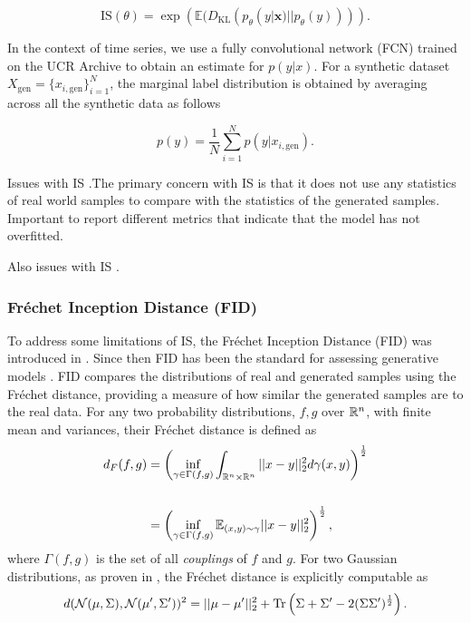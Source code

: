\documentclass[../../thesis.tex]{subfiles}
\begin{document}
\begin{equation}
    \label{IS}
    {\text{IS}}(\theta) = \exp\left( \mathbb{E}(D_{\text{KL}}(p_\theta(y|\mathbf{x}) || p_\theta(y))) \right).
\end{equation}

In the context of time series, we use a fully convolutional network (FCN) trained on the UCR Archive \cite{TimeVQVAE} to obtain an estimate for $p(y|x)$. For a synthetic dataset $X_{\text{gen}} = \{x_{i,\text{gen}}\}_{i=1}^N$, the marginal label distribution is obtained by averaging across all the synthetic data as follows

\[
    p(y) = \frac{1}{N} \sum_{i=1}^N p(y |x_{i,\text{gen}}).
\]

Issues with IS \cite{barratt2018note}.The primary concern with IS is that it does not use any statistics of real world samples to compare with the statistics of the generated samples. Important to report different metrics that indicate that the model has not overfitted. 

Also issues with IS \cite{borji2021pros}.\newline



\subsubsection{Fréchet Inception Distance (FID)}
To address some limitations of IS, the Fréchet Inception Distance (FID) was introduced in \cite{heusel2018gans}. Since then FID has been the standard for assessing generative models \cite{borji2021pros}. FID compares the distributions of real and generated samples using the Fréchet distance, providing a measure of how similar the generated samples are to the real data. For any two probability distributions, $f,g$ over $\mathbb{R}^n$, with finite mean and variances, their Fréchet distance is defined as 
\begin{equation}
    \begin{aligned}
        d_F(f,g) &= \left(\inf_{\gamma \in \Gamma(f,g)} \int_{\mathbb{R}^n\times\mathbb{R}^n}||x-y||_2^2d\gamma(x,y) \right)^{\frac{1}{2}}\\\\
            &= \left(\inf_{\gamma \in \Gamma(f,g)} \mathbb{E}_{(x,y)\sim \gamma} ||x-y||_2^2\right)^{\frac{1}{2}},
    \end{aligned}
\end{equation}
where $\Gamma(f,g)$ is the set of all \textit{couplings} of $f$ and $g$. For two Gaussian distributions, as proven in  \cite{DOWSON1982450}, the Fréchet distance is explicitly computable as
\begin{equation}
    \label{eq:FID Gaussian}
    d(\mathcal{N}(\mu,\Sigma),\mathcal{N}(\mu',\Sigma'))^2 = ||\mu-\mu'||_2^2 + \operatorname{Tr} \left( \Sigma + \Sigma' - 2(\Sigma\Sigma')^{\frac12}\right).
\end{equation}
\end{document}
